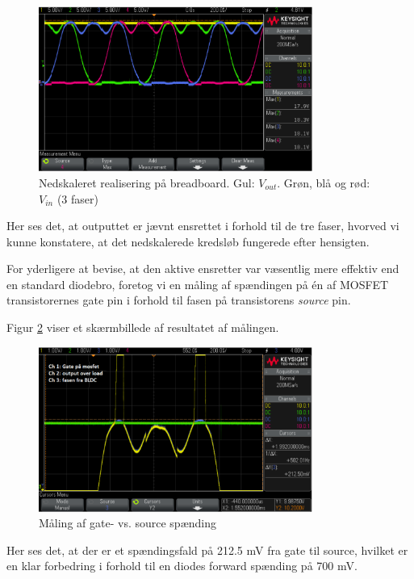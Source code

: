 \begin{figure}[h]
  \centering
  \includegraphics[width=0.8\textwidth]{prens7.png}
  \caption{Nedskaleret realisering på breadboard. Gul: $V_{out}$. Grøn, blå og rød: $V_{in}$ (3 faser)}
  \label{fig:prens7}
\end{figure}

Her ses det, at outputtet er jævnt ensrettet i forhold til de tre faser, hvorved vi kunne konstatere, at det nedskalerede kredsløb fungerede efter hensigten.  

For yderligere at bevise, at den aktive ensretter var væsentlig mere effektiv end en standard diodebro, foretog vi en måling af spændingen på én af MOSFET transistorernes gate pin i forhold til fasen på transistorens \textit{source} pin.

Figur \ref{fig:prens8} viser et skærmbillede af resultatet af målingen. 

\begin{figure}[h]
  \centering
  \includegraphics[width=0.8\textwidth]{prens8.png}
  \caption{Måling af gate- vs. source spænding}
  \label{fig:prens8}
\end{figure}

Her ses det, at der er et spændingsfald på 212.5 mV fra gate til source, hvilket er en klar forbedring i forhold til en diodes forward spænding på 700 mV.

